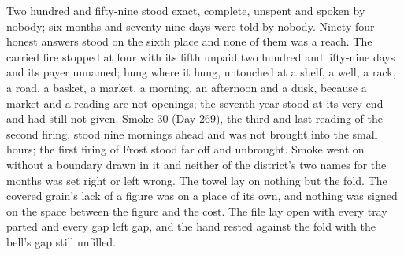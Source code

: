 Two hundred and fifty-nine stood exact, complete, unspent and spoken by nobody; six months and seventy-nine days were told by nobody. Ninety-four honest answers stood on the sixth place and none of them was a reach. The carried fire stopped at four with its fifth unpaid two hundred and fifty-nine days and its payer unnamed;  hung where it hung, untouched at a shelf, a well, a rack, a road, a basket, a market, a morning, an afternoon and a dusk, because a market and a reading are not openings; the seventh year stood at its very end and had still not given. Smoke 30 (Day 269), the third and last reading of the second firing, stood nine mornings ahead and was not brought into the small hours; the first firing of Frost stood far off and unbrought. Smoke went on without a boundary drawn in it and neither of the district's two names for the months was set right or left wrong. The towel lay on nothing but the fold. The covered grain's lack of a figure was on a place of its own, and nothing was signed on the space between the figure and the cost. The file lay open with every tray parted and every gap left gap, and the hand rested against the fold with the bell's gap still unfilled.
